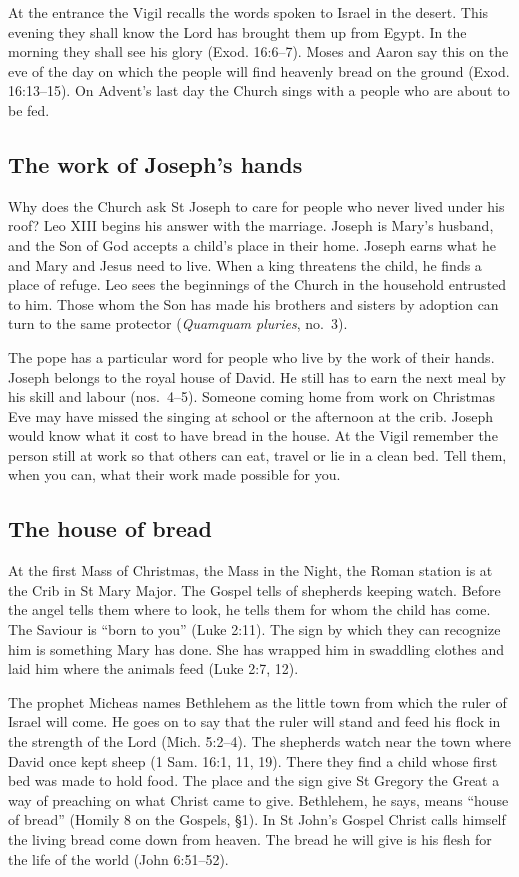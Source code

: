 At the entrance the Vigil recalls the words spoken to Israel in the
desert. This evening they shall know the Lord has brought them up from
Egypt. In the morning they shall see his glory (Exod. 16:6--7). Moses
and Aaron say this on the eve of the day on which the people will find
heavenly bread on the ground (Exod. 16:13--15). On Advent's last day the
Church sings with a people who are about to be fed.

\subsection{The work of Joseph's hands}

Why does the Church ask St Joseph to care for people who never lived
under his roof? Leo XIII begins his answer with the marriage. Joseph
is Mary's husband, and the Son of God accepts a child's place in their
home. Joseph earns what he and Mary and Jesus need to live. When a
king threatens the child, he finds a place of refuge. Leo sees the
beginnings of the Church in the household entrusted to him. Those
whom the Son has made his brothers and sisters by adoption can turn
to the same protector (\emph{Quamquam pluries}, no.~3).

The pope has a particular word for people who live by the work of
their hands. Joseph belongs to the royal house of David. He still
has to earn the next meal by his skill and labour (nos.~4--5).
Someone coming home from work on Christmas Eve may have missed the
singing at school or the afternoon at the crib. Joseph would know
what it cost to have bread in the house. At the Vigil remember the
person still at work so that others can eat, travel or lie in a clean
bed. Tell them, when you can, what their work made possible for you.

\subsection{The house of bread}
\label{sec:advent-bethlehem}

At the first Mass of Christmas, the Mass in the Night, the Roman station
is at the Crib in St Mary Major. The Gospel tells of shepherds keeping
watch. Before the angel tells them where to look, he tells them for
whom the child has come. The Saviour is “born to you” (Luke 2:11).
The sign by which they can recognize him is something Mary has done.
She has wrapped him in swaddling clothes and laid him where the animals
feed (Luke 2:7, 12).

The prophet Micheas names Bethlehem as the little town from which the
ruler of Israel will come. He goes on to say that the ruler will stand
and feed his flock in the strength of the Lord (Mich. 5:2--4). The
shepherds watch near the town where David once kept sheep
(1 Sam. 16:1, 11, 19). There they find a child whose first bed was made
to hold food. The place and the sign give St Gregory the Great a way of
preaching on what Christ came to give. Bethlehem, he says, means “house
of bread” (Homily 8 on the Gospels, \S1). In St John's Gospel Christ
calls himself the living bread come down from heaven. The bread he will
give is his flesh for the life of the world (John 6:51--52).

